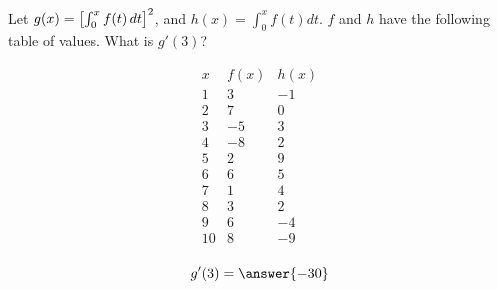\documentclass{ximera}
\author{Steven Gubkin}
\begin{document}
\begin{exercise}

Let $g(x) =  \left[ \int_0^{x} f(t) \mathop{}\!d t \right]^2$, and $h(x) = \int_0^{x} f(t) dt$.  $f$ and $h$ have the following table of values.  What is $g'(3)$?

\[
\begin{array}{c|c|c}
 x & f(x)  & h(x)\\ \hline
1 & 3 & -1\\
2 & 7 & 0\\
3 & -5 & 3\\
4 & -8& 2 \\
5 & 2 & 9\\
6 & 6 & 5\\
7 & 1 & 4\\
8 & 3& 2 \\
9 & 6 & -4\\
10 & 8& -9\\
\end{array}
\]

\begin{prompt}
	\[
		g'(3) = \answer{-30}
	\]
\end{prompt}

\end{exercise}
\end{document}

